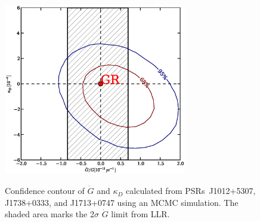 \documentclass[12pt,preprint]{aastex}
\begin{document}
\begin{figure}
\includegraphics[width=8cm]{finalGdot.ps} \\ 
\caption {\label{fig:Gdot} Confidence contour of $\dot{G}$ and $\kappa_D$
calculated from PSRs~J1012+5307, J1738+0333, and J1713+0747 using an MCMC simulation.
The shaded area marks the 2$\sigma$ $\dot{G}$ limit from LLR. 
} 
\end{figure} 




%




\end{document}
